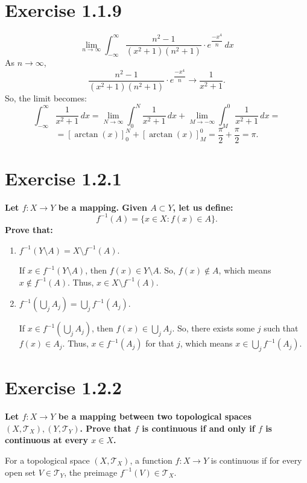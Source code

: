 \documentclass[11pt]{article}
\begin{document}
\section*{Exercise 1.1.9}
\[\lim_{n \to \infty} \int_{-\infty}^{\infty} \dfrac{n^2 - 1}{(x^2 + 1)(n^2 + 1)} \cdot e^{\dfrac{-x^4}{n}} \, dx\]
As \(n \to \infty\),
\[\dfrac{n^2 - 1}{(x^2 + 1)(n^2 + 1)} \cdot e^{\dfrac{-x^4  }{n}} \to \dfrac{1}{x^2 + 1}.\]
So, the limit becomes:
\[\int_{-\infty}^{\infty} \dfrac{1}{x^2 + 1} \, dx = \lim_{N \to \infty} \int_{0}^{N} \dfrac{1}{x^2 + 1} \, dx + \lim_{M \to -\infty} \int_{M}^{0} \dfrac{1}{x^2 + 1} \, dx = \] 
\[= \left[\arctan(x)\right]_{0}^{N} + \left[\arctan(x)\right]_{M}^{0} = \dfrac{\pi}{2} + \dfrac{\pi}{2} = \pi.\]

\pagebreak
\section*{Exercise 1.2.1}
\textbf{\large Let \(f: X \to Y\) be a mapping. Given \(A \subset Y\), let us define:
\[f^{-1}(A) = \{x \in X : f(x) \in A\}.\]
Prove that:}
\begin{enumerate}
    \item \(f^{-1}(Y \setminus A) = X \setminus f^{-1}(A)\).

        If \(x \in f^{-1}(Y \setminus A)\), then \(f(x) \in Y \setminus A\). So, \(f(x) \notin A\), which means \(x \notin f^{-1}(A)\). Thus, \(x \in X \setminus f^{-1}(A)\).

    \item \(f^{-1}\left(\bigcup_{j} A_j\right) = \bigcup_{j} f^{-1}(A_j)\).
    
        If \(x \in f^{-1}\left(\bigcup_{j} A_j\right)\), then \(f(x) \in \bigcup_{j} A_j\). So, there exists some \(j\) such that \(f(x) \in A_j\). Thus, \(x \in f^{-1}(A_j)\) for that \(j\), which means \(x \in \bigcup_{j} f^{-1}(A_j)\).

\end{enumerate}

\section*{Exercise 1.2.2}
\textbf{\large Let \(f : X \to Y\) be a mapping between two topological spaces \((X, \mathcal{T}_X ),
(Y, \mathcal{T}_Y )\). Prove that \(f\) is continuous if and only if \(f\) is continuous at every \(x \in X\).}

For a topological space \((X, \mathcal{T}_X)\), a function \(f: X \to Y\) is continuous if for every open set \(V \in \mathcal{T}_Y\), the preimage \(f^{-1}(V) \in \mathcal{T}_X\).
\end{document}
